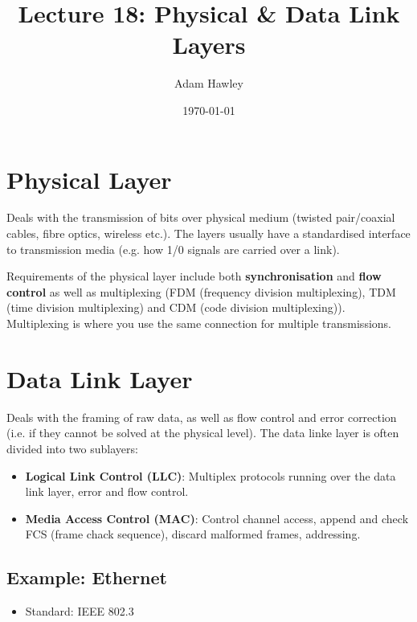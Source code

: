 \documentclass[11pt]{article}
\author{Adam Hawley}
\date{\today}
\title{Lecture 18: Physical \& Data Link Layers}
\begin{document}
\maketitle
\tableofcontents


\section{Physical Layer}
\label{sec:org454d4f9}
Deals with the transmission of bits over physical medium (twisted pair/coaxial cables, fibre optics, wireless etc.).
The layers usually have a standardised interface to transmission media (e.g. how 1/0 signals are carried over a link).

Requirements of the physical layer include both \textbf{synchronisation} and \textbf{flow control} as well as multiplexing (FDM (frequency division multiplexing), TDM (time division multiplexing) and CDM (code division multiplexing)).
Multiplexing is where you use the same connection for multiple transmissions.

\section{Data Link Layer}
\label{sec:org3fb3528}
Deals with the framing of raw data, as well as flow control and error correction (i.e. if they cannot be solved at the physical level).
The data linke layer is often divided into two sublayers:
\begin{itemize}
\item \textbf{Logical Link Control (LLC)}: Multiplex protocols running over the data link layer, error and flow control.
\item \textbf{Media Access Control (MAC)}: Control channel access, append and check FCS (frame chack sequence), discard malformed frames, addressing.
\end{itemize}

\subsection{Example: Ethernet}
\label{sec:orgbca43ec}
\begin{itemize}
\item Standard: IEEE 802.3
\end{itemize}
\end{document}
